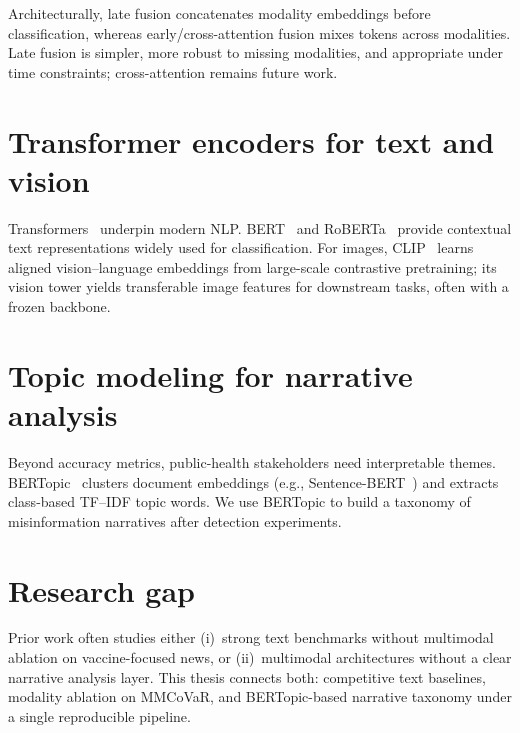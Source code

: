 Architecturally, late fusion concatenates modality embeddings before classification, whereas early/cross-attention fusion mixes tokens across modalities.
Late fusion is simpler, more robust to missing modalities, and appropriate under time constraints; cross-attention remains future work.

\section{Transformer encoders for text and vision}

Transformers~\cite{vaswani2017attention} underpin modern NLP.
BERT~\cite{devlin2019bert} and RoBERTa~\cite{liu2019roberta} provide contextual text representations widely used for classification.
For images, CLIP~\cite{radford2021clip} learns aligned vision--language embeddings from large-scale contrastive pretraining; its vision tower yields transferable image features for downstream tasks, often with a frozen backbone.

\section{Topic modeling for narrative analysis}

Beyond accuracy metrics, public-health stakeholders need interpretable themes.
BERTopic~\cite{grootendorst2022bertopic} clusters document embeddings (e.g., Sentence-BERT~\cite{reimers2019sentence}) and extracts class-based TF--IDF topic words.
We use BERTopic to build a taxonomy of misinformation narratives after detection experiments.

\section{Research gap}

Prior work often studies either (i)~strong text benchmarks without multimodal ablation on vaccine-focused news, or (ii)~multimodal architectures without a clear narrative analysis layer.
This thesis connects both: competitive text baselines, modality ablation on MMCoVaR, and BERTopic-based narrative taxonomy under a single reproducible pipeline.
